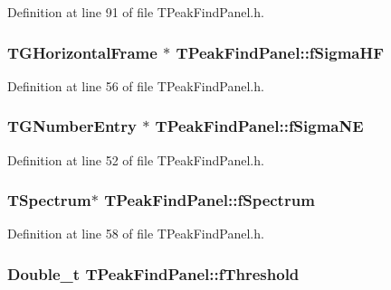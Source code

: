 Definition at line 91 of file TPeakFindPanel.h.

\subsubsection[{fSigmaHF}]{\setlength{\rightskip}{0pt plus 5cm}TGHorizontalFrame $\ast$ {\bf TPeakFindPanel::fSigmaHF}\hspace{0.3cm}{\ttfamily  [private]}}\label{classTPeakFindPanel_a031d9ec5bf000c5547391bcddc713c00}


Definition at line 56 of file TPeakFindPanel.h.

\subsubsection[{fSigmaNE}]{\setlength{\rightskip}{0pt plus 5cm}TGNumberEntry $\ast$ {\bf TPeakFindPanel::fSigmaNE}\hspace{0.3cm}{\ttfamily  [private]}}\label{classTPeakFindPanel_a58cf52897f07d99bb5ba86a17edd268a}


Definition at line 52 of file TPeakFindPanel.h.

\subsubsection[{fSpectrum}]{\setlength{\rightskip}{0pt plus 5cm}TSpectrum$\ast$ {\bf TPeakFindPanel::fSpectrum}\hspace{0.3cm}{\ttfamily  [private]}}\label{classTPeakFindPanel_a9edb774f14fa459a97e99a134b765d4e}


Definition at line 58 of file TPeakFindPanel.h.

\subsubsection[{fThreshold}]{\setlength{\rightskip}{0pt plus 5cm}Double\_\-t {\bf TPeakFindPanel::fThreshold}\hspace{0.3cm}{\ttfamily  [protected]}}\label{classTPeakFindPanel_a4fb254ac20318cdfdb04ade53ea60c6f}


